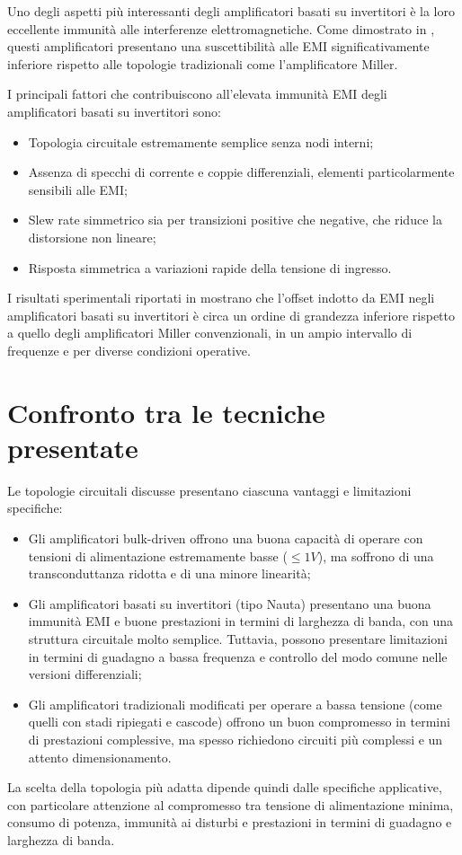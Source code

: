 Uno degli aspetti più interessanti degli amplificatori basati su invertitori è la loro eccellente immunità alle interferenze elettromagnetiche. Come dimostrato in \cite{EMI_Immunity_of_the_Nauta_Inverter-Based_Amplifier}, questi amplificatori presentano una suscettibilità alle EMI significativamente inferiore rispetto alle topologie tradizionali come l'amplificatore Miller.

I principali fattori che contribuiscono all'elevata immunità EMI degli amplificatori basati su invertitori sono:
\begin{itemize}
   \item Topologia circuitale estremamente semplice senza nodi interni;
   \item Assenza di specchi di corrente e coppie differenziali, elementi particolarmente sensibili alle EMI;
   \item Slew rate simmetrico sia per transizioni positive che negative, che riduce la distorsione non lineare;
   \item Risposta simmetrica a variazioni rapide della tensione di ingresso.
\end{itemize}

I risultati sperimentali riportati in \cite{EMI_Immunity_of_the_Nauta_Inverter-Based_Amplifier} mostrano che l'offset indotto da EMI negli amplificatori basati su invertitori è circa un ordine di grandezza inferiore rispetto a quello degli amplificatori Miller convenzionali, in un ampio intervallo di frequenze e per diverse condizioni operative.

\section{Confronto tra le tecniche presentate}

Le topologie circuitali discusse presentano ciascuna vantaggi e limitazioni specifiche:

\begin{itemize}
   \item Gli amplificatori bulk-driven offrono una buona capacità di operare con tensioni di alimentazione estremamente basse ($\le 1V$), ma soffrono di una transconduttanza ridotta e di una minore linearità;
   
   \item Gli amplificatori basati su invertitori (tipo Nauta) presentano una buona immunità EMI e buone prestazioni in termini di larghezza di banda, con una struttura circuitale molto semplice. Tuttavia, possono presentare limitazioni in termini di guadagno a bassa frequenza e controllo del modo comune nelle versioni differenziali;
   
   \item Gli amplificatori tradizionali modificati per operare a bassa tensione (come quelli con stadi ripiegati e cascode) offrono un buon compromesso in termini di prestazioni complessive, ma spesso richiedono circuiti più complessi e un attento dimensionamento.
\end{itemize}

La scelta della topologia più adatta dipende quindi dalle specifiche applicative, con particolare attenzione al compromesso tra tensione di alimentazione minima, consumo di potenza, immunità ai disturbi e prestazioni in termini di guadagno e larghezza di banda.